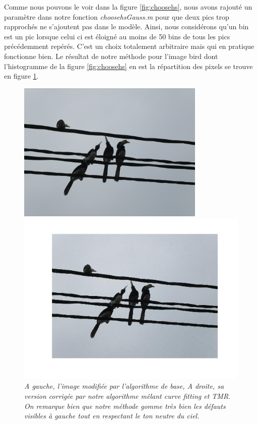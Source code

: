 \documentclass{article}
\begin{document}
Comme nous pouvons le voir dans la figure \ref{fig:choosehs},  nous avons rajouté un paramètre dans notre fonction \textit{choosehsGauss.m} pour que deux pics trop rapprochés ne s'ajoutent pas dans le modèle.  Ainsi, nous considérons qu'un bin est un pic lorsque celui ci est éloigné au moins de 50 bins de tous les pics précédemment repérés. C'est un choix totalement arbitraire mais qui en pratique fonctionne bien. Le résultat de notre méthode pour l'image bird dont l'histogramme de la figure \ref{fig:choosehs} en est la répartition des pixels se trouve en figure \ref{fig:bird_tmr}.

\begin{figure}
\centering
\begin{minipage}{0.5\textwidth}
\centering
\includegraphics[width=0.8\textwidth]{../pictures/birds.jpg}
\end{minipage}%
\begin{minipage}{0.5\textwidth}
\centering
\includegraphics[width=1\textwidth]{images/birds_tmr.jpg}
\end{minipage}
\caption{\textit{A gauche, l'image modifiée par l'algorithme de base, A droite, sa version corrigée par notre algorithme mêlant curve fitting et TMR. On remarque bien que notre méthode gomme très bien les défauts visibles à gauche tout en respectant le ton neutre du ciel.}}
\label{fig:bird_tmr}
\end{figure}
\end{document}
